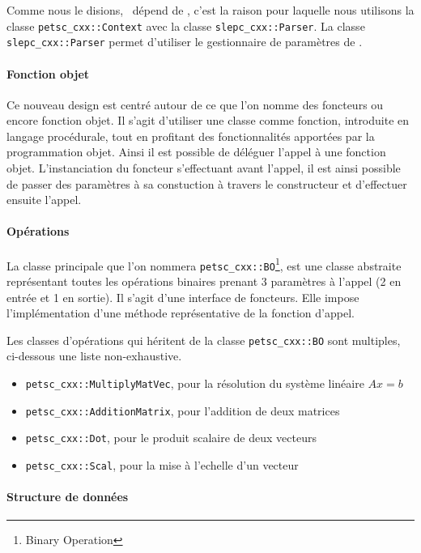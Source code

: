 Comme nous le disions, \slepcx\ dépend de \petscx, c'est la raison pour laquelle nous utilisons la classe \verb#petsc_cxx::Context# avec la classe \verb#slepc_cxx::Parser#. La classe \verb#slepc_cxx::Parser# permet d'utiliser le gestionnaire de paramètres de \slepc.

\paragraph{Fonction objet}

Ce nouveau design est centré autour de ce que l'on nomme des foncteurs ou encore fonction objet. Il s'agit d'utiliser une classe comme fonction, introduite en langage procédurale, tout en profitant des fonctionnalités apportées par la programmation objet. Ainsi il est possible de déléguer l'appel à une fonction objet. L'instanciation du foncteur s'effectuant avant l'appel, il est ainsi possible de passer des paramètres à sa constuction à travers le constructeur et d'effectuer ensuite l'appel.

\paragraph{Opérations}

La classe principale que l'on nommera \verb#petsc_cxx::BO#\footnote{Binary Operation}, est une classe abstraite représentant toutes les opérations binaires prenant 3 paramètres à l'appel (2 en entrée et 1 en sortie). Il s'agit d'une interface de foncteurs. Elle impose l'implémentation d'une méthode représentative de la fonction d'appel.

Les classes d'opérations qui héritent de la classe \verb#petsc_cxx::BO# sont multiples, ci-dessous une liste non-exhaustive.

\begin{itemize}
\item \verb#petsc_cxx::MultiplyMatVec#, pour la résolution du système linéaire $Ax = b$
\item \verb#petsc_cxx::AdditionMatrix#, pour l'addition de deux matrices
\item \verb#petsc_cxx::Dot#, pour le produit scalaire de deux vecteurs
\item \verb#petsc_cxx::Scal#, pour la mise à l'echelle d'un vecteur
\end{itemize}

\paragraph{Structure de données}

